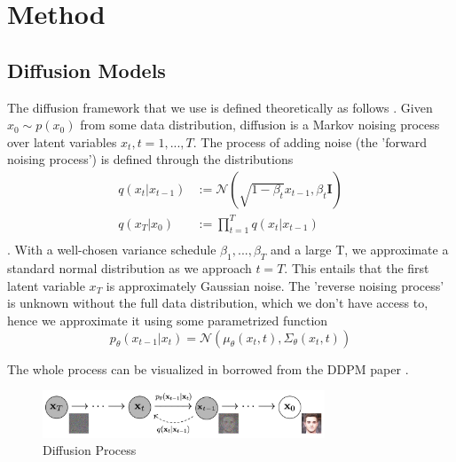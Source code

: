 \section{Method}

\subsection{Diffusion Models}
\label{sec:diffusion_models}
The diffusion framework that we use is defined theoretically as follows \cite{ddpm,improved_diffusion,EDGE}. Given $x_0 \sim p(x_0)$ from some data distribution, diffusion is a Markov noising process over latent variables $x_t, t=1,...,T$. The process of adding noise (the 'forward noising process') is defined through the distributions
\begin{equation}
    \begin{aligned}
        q(x_t|x_{t-1}) &:= \mathcal{N}(\sqrt{1-\beta_t} x_{t-1}, \beta_t \mathbf{I}) \\
        q(x_T | x_0) &:= \prod_{t=1}^T q(x_t | x_{t-1}) \\
    \end{aligned}
\end{equation}
. With a well-chosen variance schedule $\beta_1, ..., \beta_T$ and a large T, we approximate a standard normal distribution as we approach $t=T$. This entails that the first latent variable $x_T$ is approximately Gaussian noise. The 'reverse noising process' is unknown without the full data distribution, which we don't have access to, hence we approximate it using some parametrized function
\begin{equation}
    \label{eq:reverse_noising_mean_variance}
    p_{\theta}(x_{t-1} | x_t) = \mathcal{N}(\mu_{\theta}(x_t, t), \Sigma_{\theta}(x_t, t))
\end{equation}

The whole process can be visualized in  borrowed from the DDPM paper \cite{ddpm}.

\begin{figure}[!ht]
    \centering
    \includegraphics[width=0.75\textwidth]{Figures/diffusion/diffusion_process.png}
    \caption{Diffusion Process}
    \label{fig:diffusion_process}
\end{figure}

